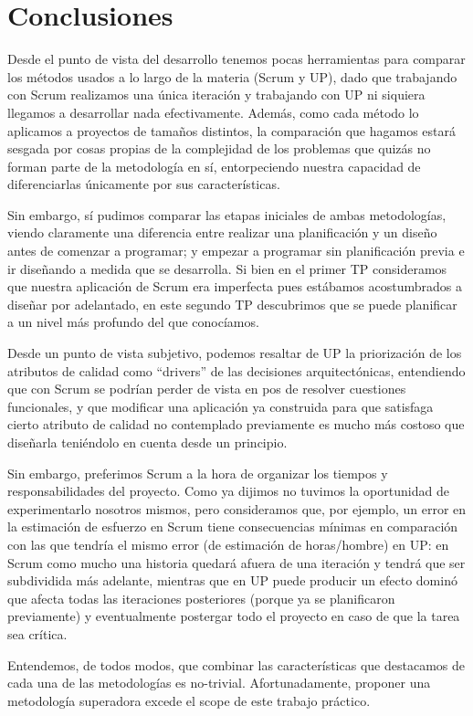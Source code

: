 \documentclass[a4paper, 10pt, twoside]{article}
\begin{document}
\section{Conclusiones}
Desde el punto de vista del desarrollo tenemos pocas herramientas para comparar los métodos usados a lo largo de la materia (Scrum y UP),
dado que trabajando con Scrum realizamos una única iteración y trabajando con UP ni siquiera llegamos a desarrollar nada efectivamente.
Además, como cada método lo aplicamos a proyectos de tamaños distintos, la comparación que hagamos estará sesgada por cosas propias de la
complejidad de los problemas que quizás no forman parte de la metodología en sí, entorpeciendo nuestra capacidad de diferenciarlas únicamente
por sus características.

Sin embargo, sí pudimos comparar las etapas iniciales de ambas metodologías, viendo claramente una diferencia entre realizar una planificación
y un diseño antes de comenzar a programar; y empezar a programar sin planificación previa e ir diseñando a medida que se desarrolla. Si bien
en el primer TP consideramos que nuestra aplicación de Scrum era imperfecta pues estábamos acostumbrados a diseñar por adelantado,
en este segundo TP descubrimos que se puede planificar a un nivel más profundo del que conocíamos.

Desde un punto de vista subjetivo, podemos resaltar de UP la priorización de los atributos de calidad como ``drivers'' de las decisiones arquitectónicas,
entendiendo que con Scrum se podrían perder de vista en pos de resolver cuestiones funcionales, y que modificar una aplicación ya construida para que
satisfaga cierto atributo de calidad no contemplado previamente es mucho más costoso que diseñarla teniéndolo en cuenta desde un principio.

Sin embargo, preferimos Scrum a la hora de organizar los tiempos y responsabilidades del proyecto. Como ya dijimos no tuvimos la oportunidad de
experimentarlo nosotros mismos, pero consideramos que, por ejemplo, un error en la estimación de esfuerzo en Scrum tiene consecuencias mínimas
en comparación con las que tendría el mismo error (de estimación de horas/hombre) en UP: en Scrum como mucho una historia quedará afuera de una iteración y
tendrá que ser subdividida más adelante, mientras que en UP puede producir un efecto dominó que afecta todas las iteraciones posteriores
(porque ya se planificaron previamente) y eventualmente postergar todo el proyecto en caso de que la tarea sea crítica.

Entendemos, de todos modos, que combinar las características que destacamos de cada una de las metodologías es no-trivial. Afortunadamente, proponer una metodología
superadora excede el scope de este trabajo práctico.
\end{document}
